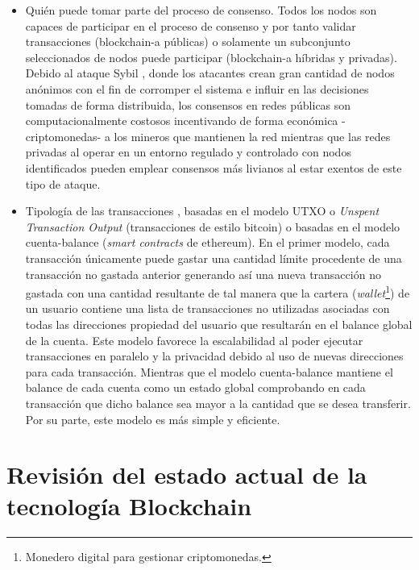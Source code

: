 \documentclass[12pt,a4paper, twoside]{report}
\begin{document}
\begin{itemize}
		\item Quién puede tomar parte del proceso de consenso. Todos los nodos son capaces de participar en el proceso de consenso y por tanto validar transacciones (\gls{blockchain-a} públicas) o solamente un subconjunto seleccionados de nodos puede participar (\gls{blockchain-a} híbridas y privadas). Debido al ataque Sybil \cite{douceur:2002:sybil}, donde los atacantes crean gran cantidad de nodos anónimos con el fin de corromper el sistema e influir en las decisiones tomadas de forma distribuida, los consensos en redes públicas son computacionalmente costosos incentivando de forma económica -criptomonedas- a los mineros que mantienen la red mientras que las redes privadas al operar en un entorno regulado y controlado con nodos identificados pueden emplear consensos más livianos al estar exentos de este tipo de ataque.
		
		\item Tipología de las transacciones \cite{uxto:2018}, basadas en el modelo UTXO o \textit{Unspent Transaction Output} (transacciones de estilo \gls{bitcoin}) o basadas en el modelo cuenta-balance (\textit{smart contracts} de \gls{ethereum}). En el primer modelo, cada transacción únicamente puede gastar una cantidad límite procedente de una transacción no gastada anterior generando así una nueva transacción no gastada con una cantidad resultante de tal manera que la cartera (\textit{wallet}\footnote{Monedero digital para gestionar criptomonedas.}) de un usuario contiene una lista de transacciones no utilizadas asociadas con todas las direcciones propiedad del usuario que resultarán en el balance global de la cuenta. Este modelo favorece la escalabilidad al poder ejecutar transacciones en paralelo y la privacidad debido al uso de nuevas direcciones para cada transacción. Mientras que el modelo cuenta-balance mantiene el balance de cada cuenta como un estado global comprobando en cada transacción que dicho balance sea mayor a la cantidad que se desea transferir. Por su parte, este modelo es más simple y eficiente.

	\end{itemize}

	\section{Revisión del estado actual de la tecnología Blockchain}
	
\end{document}
